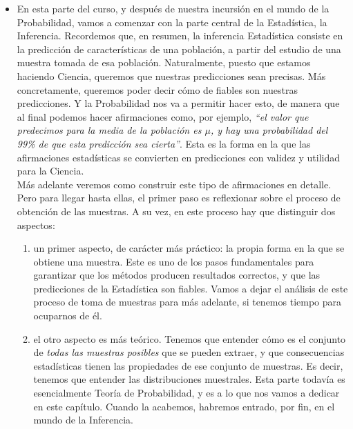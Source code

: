 \begin{itemize}
    \item En esta parte del curso, y después de nuestra incursión en el mundo de la Probabilidad, vamos a comenzar con la parte central de la Estadística, la {\sf Inferencia.} Recordemos que, en resumen, la inferencia Estadística consiste en la predicción de características de una población, a partir del estudio de una muestra tomada de esa población. Naturalmente, puesto que estamos haciendo Ciencia, queremos que nuestras predicciones sean precisas. Más concretamente, queremos poder decir cómo de fiables son nuestras predicciones. Y la Probabilidad nos va a permitir hacer esto, de manera que al final podemos hacer afirmaciones como, por ejemplo, {\em ``el valor que predecimos para la media de la población es $\mu$, {\sf y hay una probabilidad del 99\% de que esta predicción sea cierta}''}. Esta es la forma en la que las afirmaciones estadísticas se convierten en predicciones con validez y utilidad para la Ciencia. \\[3mm]
        Más adelante veremos como construir este tipo de afirmaciones en detalle. Pero para llegar hasta ellas, el primer paso es reflexionar sobre el proceso de obtención de las muestras. A su vez, en este proceso hay que distinguir dos aspectos:
        \begin{enumerate}
        \item un primer aspecto, de carácter más práctico: la propia forma en la que se obtiene una muestra. Este es uno de los pasos fundamentales para garantizar que los métodos producen resultados correctos, y que las predicciones de la Estadística son fiables. Vamos a dejar el análisis de este proceso de toma de muestras para más adelante, si tenemos tiempo para ocuparnos de él.
        \item el otro aspecto es más teórico. Tenemos que entender cómo es el conjunto de {\em todas las muestras posibles} que se pueden extraer, y que consecuencias estadísticas tienen las propiedades de ese conjunto de muestras. Es decir, tenemos que entender las {\sf distribuciones muestrales}. Esta parte todavía es esencialmente Teoría de Probabilidad, y es a lo que nos vamos a dedicar en este capítulo. Cuando la acabemos, habremos entrado, por fin, en el mundo de la Inferencia.
        \end{enumerate}


\end{itemize}
